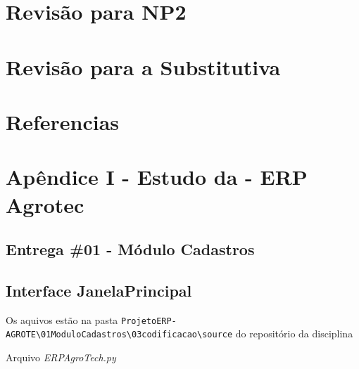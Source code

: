 \documentclass[
]{book}
\begin{document}
\chapter{Revisão para NP2}\label{revisuxe3o-para-np2}

\chapter{Revisão para a Substitutiva}\label{revisuxe3o-para-a-substitutiva}

\chapter{Referencias}\label{referencias}

\chapter{Apêndice I - Estudo da - ERP Agrotec}\label{apuxeandice-i---estudo-da---erp-agrotec}

\section{Entrega \#01 - Módulo Cadastros}\label{entrega-01---muxf3dulo-cadastros}

\section{Interface JanelaPrincipal}\label{interface-janelaprincipal}

Os aquivos estão na pasta \texttt{ProjetoERP-AGROTE\textbackslash{}01ModuloCadastros\textbackslash{}03codificacao\textbackslash{}source} do repositório da disciplina

Arquivo \emph{ERPAgroTech.py}
\end{document}
